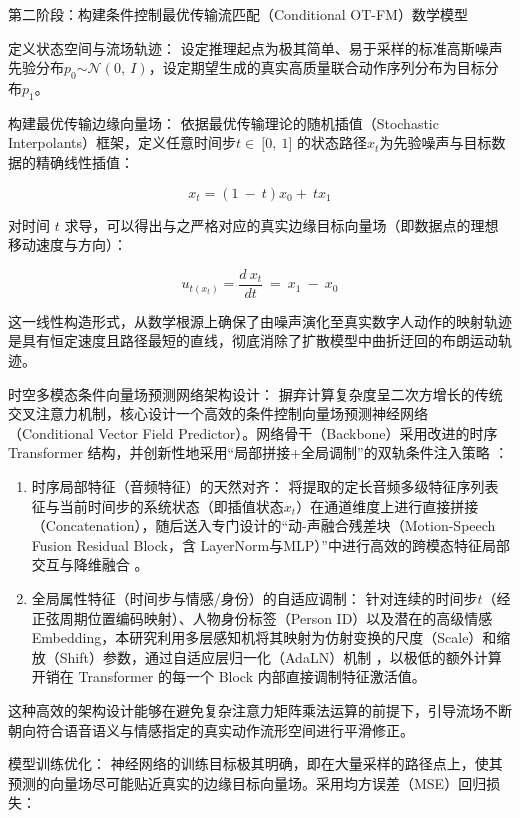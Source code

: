 \documentclass[UTF8]{ctexart}
\begin{document}
第二阶段：构建条件控制最优传输流匹配（Conditional OT-FM）数学模型

定义状态空间与流场轨迹：
设定推理起点为极其简单、易于采样的标准高斯噪声先验分布\(p_{0}\mathcal{\sim N}(0,\ I)\)，设定期望生成的真实高质量联合动作序列分布为目标分布\(p_{1}\)。

构建最优传输边缘向量场： 依据最优传输理论的随机插值（Stochastic
Interpolants）框架，定义任意时间步\(t \in \ \lbrack 0,\ 1\rbrack\)
的状态路径\(x_{t}\)为先验噪声与目标数据的精确线性插值：

\[x_{t} = (1\  - \ t)x_{0} + \ tx_{1}\]

对时间 \(t\)
求导，可以得出与之严格对应的真实边缘目标向量场（即数据点的理想移动速度与方向）：

\[u_{t\left( x_{t} \right)} = \frac{d\ x_{t}}{dt}\  = \ x_{1}\  - \ x_{0}\]

这一线性构造形式，从数学根源上确保了由噪声演化至真实数字人动作的映射轨迹是具有恒定速度且路径最短的直线，彻底消除了扩散模型中曲折迂回的布朗运动轨迹。

时空多模态条件向量场预测网络架构设计：
摒弃计算复杂度呈二次方增长的传统交叉注意力机制，核心设计一个高效的条件控制向量场预测神经网络（Conditional
Vector Field Predictor）。网络骨干（Backbone）采用改进的时序 Transformer
结构，并创新性地采用``局部拼接+全局调制''的双轨条件注入策略 ：

\begin{enumerate}
\def\labelenumi{\arabic{enumi}.}
\item
  时序局部特征（音频特征）的天然对齐：
  将提取的定长音频多级特征序列表征与当前时间步的系统状态（即插值状态\(x_{t}\)）在通道维度上进行直接拼接（Concatenation），随后送入专门设计的``动-声融合残差块（Motion-Speech
  Fusion Residual Block，含
  LayerNorm与MLP）''中进行高效的跨模态特征局部交互与降维融合 。
\item
  全局属性特征（时间步与情感/身份）的自适应调制：
  针对连续的时间步\(t\)（经正弦周期位置编码映射）、人物身份标签（Person
  ID）以及潜在的高级情感
  Embedding，本研究利用多层感知机将其映射为仿射变换的尺度（Scale）和缩放（Shift）参数，通过自适应层归一化（AdaLN）机制
  ，以极低的额外计算开销在 Transformer 的每一个 Block
  内部直接调制特征激活值。
\end{enumerate}

这种高效的架构设计能够在避免复杂注意力矩阵乘法运算的前提下，引导流场不断朝向符合语音语义与情感指定的真实动作流形空间进行平滑修正。

模型训练优化：
神经网络的训练目标极其明确，即在大量采样的路径点上，使其预测的向量场尽可能贴近真实的边缘目标向量场。采用均方误差（MSE）回归损失：
\end{document}
